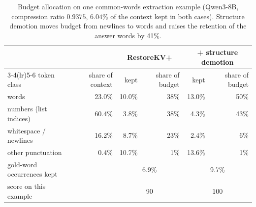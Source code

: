 \documentclass[11pt]{article}
\begin{document}
\begin{table}[t]
\centering
\small
\begin{tabular}{lrrrrr}
\toprule
 & & \multicolumn{2}{c}{RestoreKV+} & \multicolumn{2}{c}{+ structure demotion} \\
\cmidrule(lr){3-4}\cmidrule(lr){5-6}
token class & share of context & kept & share of budget & kept & share of budget \\
\midrule
words & 23.0\% & 10.0\% & 38\% & 13.0\% & 50\% \\
numbers (list indices) & 60.4\% & 3.8\% & 38\% & 4.3\% & 43\% \\
whitespace / newlines & 16.2\% & 8.7\% & 23\% & 2.4\% & 6\% \\
other punctuation & 0.4\% & 10.7\% & 1\% & 13.6\% & 1\% \\
\midrule
gold-word occurrences kept & & \multicolumn{2}{c}{6.9\%} & \multicolumn{2}{c}{9.7\%} \\
score on this example & & \multicolumn{2}{c}{90} & \multicolumn{2}{c}{100} \\
\bottomrule
\end{tabular}
\caption{Budget allocation on one common-words extraction example (Qwen3-8B, compression ratio $0.9375$, $6.04\%$ of the context
kept in both cases). Structure demotion moves budget from newlines to words and raises the retention of the answer words by 41\%.}
\label{tab:budget}
\end{table}
\end{document}
